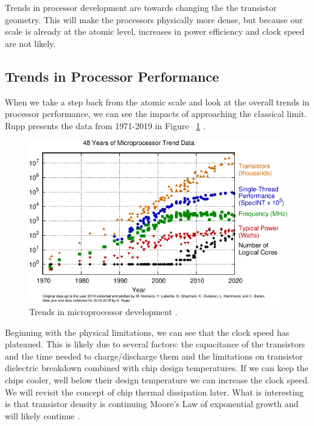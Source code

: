 \documentclass[runningheads]{llncs}
\begin{document}
Trends in processor development are towards changing the the transistor geometry.
This will make the processors physically more dense, but because our scale is already at the atomic level, increases in power efficiency and clock speed are not likely.

\subsection{Trends in Processor Performance}
When we take a step back from the atomic scale and look at the overall trends in processor performance, we can see the impacts of approaching the classical limit.
Rupp presents the data from 1971-2019 in Figure ~\ref{fig:1} \cite{rupp2020trends}.

\begin{figure}
    \includegraphics[width=\textwidth]{48-years-processor-trend.pdf}
    \caption{Trends in microprocessor development \cite{rupp2020trends}.} \label{fig:1}
\end{figure}

Beginning with the physical limitations, we can see that the clock speed has plateaued.
This is likely due to several factors: the capacitance of the transistors and the time needed to charge/discharge them and the limitations on transistor dielectric breakdown combined with chip design temperatures.
If we can keep the chips cooler, well below their design temperature we can increase the clock speed.
We will revisit the concept of chip thermal dissipation later.
What is interesting is that transistor density is continuing Moore's Law of exponential growth and will likely continue \cite{anthony2016transistors}.
\end{document}
